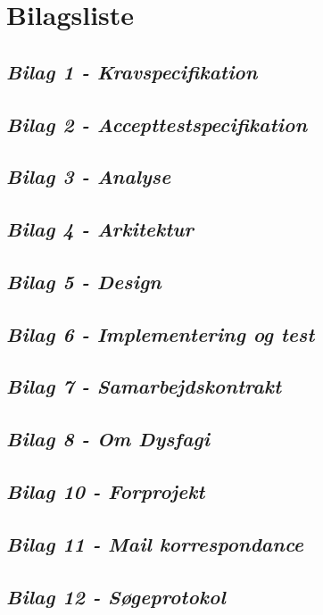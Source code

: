 \chapter{Bilagsliste}
\section*{\textit{Bilag 1 - Kravspecifikation}} \label{Kravspecifikation}
\section*{\textit{Bilag 2 - Accepttestspecifikation}} \label{Accepttestspecifikation}
\section*{\textit{Bilag 3 - Analyse}} \label{Analyse}
\section*{\textit{Bilag 4 - Arkitektur}} \label{Arkitektur}
\section*{\textit{Bilag 5 - Design}} \label{Design}
\section*{\textit{Bilag 6 - Implementering og test}} \label{Implementeringogtest}
\section*{\textit{Bilag 7 - Samarbejdskontrakt}} \label{Samarbejdskontrakt}
\section*{\textit{Bilag 8 - Om Dysfagi}} \label{OmDysfagi}
\section*{\textit{Bilag 10 - Forprojekt}} \label{Forprojekt}
\section*{\textit{Bilag 11 - Mail korrespondance}} \label{Mailkorrespondance}
\section*{\textit{Bilag 12 - Søgeprotokol}} \label{Sogeprotokol}
